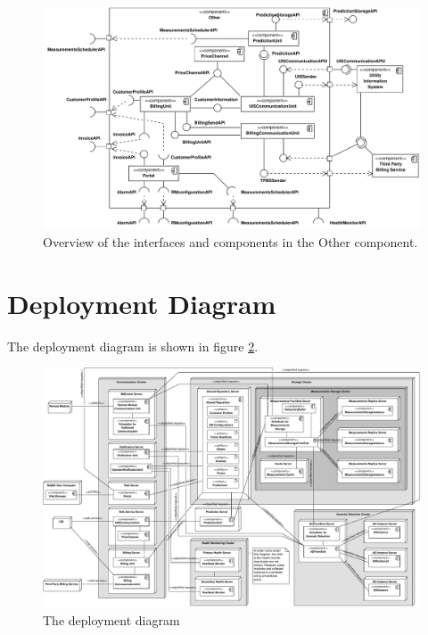 \begin{figure}
	\begin{centering}
		\includegraphics[width=1.4\textwidth,angle=90]{figs/add-it10-interfaces.pdf}
		\caption{Overview of the interfaces and components in the Other component.}
		\label{fig:final-architecture/it10}
	\end{centering}
\end{figure}

\section{Deployment Diagram}

\npar The deployment diagram is shown in figure \ref{fig:final-deployment}. 

\begin{figure}
	\begin{centering}
		\includegraphics[width=1.42\textwidth,angle=90]{figs/final-deployment.pdf}
		\caption{The deployment diagram}
		\label{fig:final-deployment}
	\end{centering}
\end{figure}

